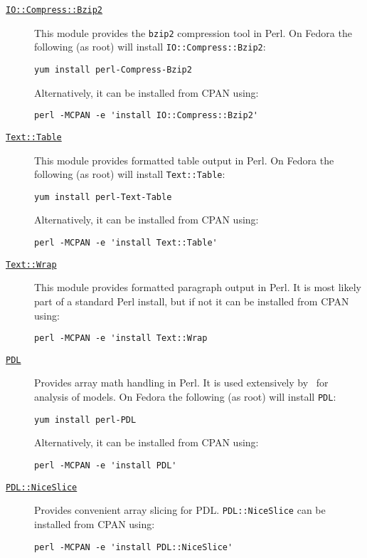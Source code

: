 \begin{description}
  \item [\href{http://perldoc.perl.org/IO/Compress/Bzip2.html}{{\tt IO::Compress::Bzip2}}] This module provides the {\tt bzip2} compression tool in Perl. On Fedora the following (as root) will install {\tt IO::Compress::Bzip2}:
\begin{verbatim}
yum install perl-Compress-Bzip2
\end{verbatim}
Alternatively, it can be installed from CPAN using:
\begin{verbatim}
perl -MCPAN -e 'install IO::Compress::Bzip2'
\end{verbatim}
  \item [\href{http://search.cpan.org/~anno/Text-Table-1.114/lib/Text/Table.pm}{{\tt Text::Table}}] This module provides formatted table output in Perl. On Fedora the following (as root) will install {\tt Text::Table}:
\begin{verbatim}
yum install perl-Text-Table
\end{verbatim}
Alternatively, it can be installed from CPAN using:
\begin{verbatim}
perl -MCPAN -e 'install Text::Table'
\end{verbatim}
  \item [\href{http://search.cpan.org/~jhi/perl-5.8.0/lib/Text/Wrap.pm}{{\tt Text::Wrap}}] This module provides formatted paragraph output in Perl. It is most likely part of a standard Perl install, but if not it can be installed from CPAN using:
\begin{verbatim}
perl -MCPAN -e 'install Text::Wrap
\end{verbatim}
\item [\href{http://pdl.perl.org/}{{\tt PDL}}] Provides array math handling in Perl. It is used extensively by \glc\ for analysis of models. On Fedora the following (as root) will install {\tt PDL}:
\begin{verbatim}
yum install perl-PDL
\end{verbatim}
Alternatively, it can be installed from CPAN using:
\begin{verbatim}
perl -MCPAN -e 'install PDL'
\end{verbatim}

\item [\href{http://search.cpan.org/dist/PDL-NiceSlice/NiceSlice.pm}{{\tt PDL::NiceSlice}}] Provides convenient array slicing for PDL. {\tt PDL::NiceSlice} can be installed from CPAN using:
\begin{verbatim}
perl -MCPAN -e 'install PDL::NiceSlice'
\end{verbatim}


\end{description}
